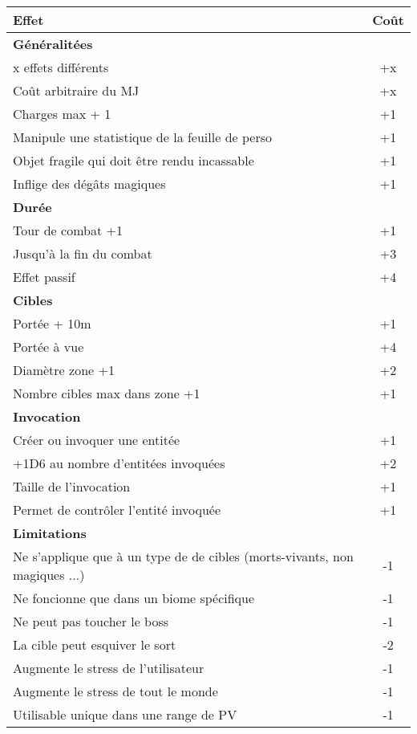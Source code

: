 \documentclass[11pt]{article} %
\newcommand{\myjump}[1][1]{\mbox{}\\[#1cm]}
\begin{document}
\myjump[0]
\begin{tabularx}{\linewidth}{|Xc|}
\hline

    \textbf{Effet} & \textbf{Coût}\\
    \hline
    \textbf{Généralitées} &\\
    x effets différents & +x\\
    Coût arbitraire du MJ & +x\\
    Charges max + 1 & +1\\
    Manipule une statistique de la feuille de perso & +1\\
    Objet fragile qui doit être rendu incassable & +1\\
    Inflige des dégâts magiques & +1\\
    \hline
    \textbf{Durée} &\\
    Tour de combat +1 & +1\\
    Jusqu'à la fin du combat & +3\\
    Effet passif & +4\\
    \hline
    \textbf{Cibles} &\\
    Portée + 10m & +1\\
    Portée à vue & +4\\
    Diamètre zone +1 & +2\\
    Nombre cibles max dans zone +1 & +1\\
    \hline
    \textbf{Invocation} &\\
    Créer ou invoquer une entitée & +1\\
    +1D6 au nombre d'entitées invoquées & +2\\
    Taille de l'invocation & +1\\
    Permet de contrôler l'entité invoquée & +1\\
    \hline
    \textbf{Limitations} &\\
    Ne s'applique que à un type de de cibles (morts-vivants, non magiques ...) & -1\\
    Ne foncionne que dans un biome spécifique & -1\\
    Ne peut pas toucher le boss & -1\\
    La cible peut esquiver le sort & -2\\
    Augmente le stress de l'utilisateur & -1\\
    Augmente le stress de tout le monde & -1\\
    Utilisable unique dans une range de PV & -1\\

\hline
\end{tabularx}
\end{document}
